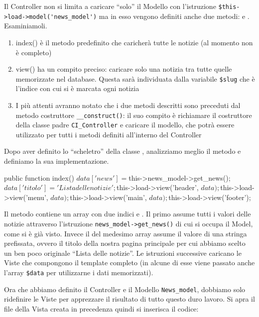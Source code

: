 Il Controller non si limita a caricare ``solo'' il Modello con l'istruzione \verb|$this->load->model('news_model')| ma in esso vengono definiti anche due metodi:  e . Esaminiamoli.

\begin{enumerate}
\item index() è il metodo predefinito che caricherà tutte le notizie (al momento non è completo)
\item view() ha un compito preciso: caricare solo una notizia tra tutte quelle memorizzate nel database. Questa sarà individuata dalla variabile \verb|$slug| che è l'indice con cui si è marcata ogni notizia
\item I più attenti avranno notato che i due metodi descritti sono preceduti dal metodo costruttore \verb|__construct()|: il suo compito è richiamare il costruttore della classe padre \verb|CI_Controller| e caricare il modello, che potrà essere utilizzato per tutti i metodi definiti all'interno del Controller
\end{enumerate}

Dopo aver definito lo ``scheletro'' della classe , analizziamo meglio il metodo  e definiamo la sua implementazione.

\begin{code}
public function index()
{
	$data['news'] = $this->news_model->get_news();
	$data['titolo'] = 'Lista delle notizie';

	$this->load->view('header', $data);
	$this->load->view('menu', $data);
	$this->load->view('main', $data);
	$this->load->view('footer');
}
\end{code}

Il metodo contiene un array  con due indici  e . Il primo assume tutti i valori delle notizie attraverso l'istruzione \verb|news_model->get_news()| di cui si occupa il Model, come si è già visto. Invece il  del medesimo array assume il valore di una stringa prefissata, ovvero il titolo della nostra pagina principale per cui abbiamo scelto un ben poco originale ``Lista delle notizie''. Le istruzioni successive caricano le Viste che compongono il template completo (in alcune di esse viene passato anche l'array \verb|$data| per utilizzarne i dati memorizzati).

Ora che abbiamo definito il Controller e il Modello \verb|News_model|, dobbiamo solo ridefinire le Viste per apprezzare il risultato di tutto questo duro lavoro. Si apra il file della Vista creata in precedenza  quindi si inserisca il codice:

